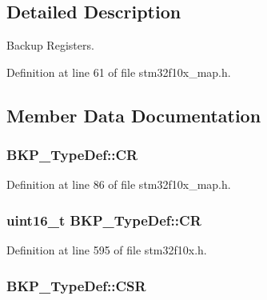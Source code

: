 \subsection{Detailed Description}
Backup Registers. 

Definition at line 61 of file stm32f10x\+\_\+map.\+h.



\subsection{Member Data Documentation}
\subsubsection[{\texorpdfstring{CR}{CR}}]{ B\+K\+P\+\_\+\+Type\+Def\+::\+CR}\hypertarget{struct_b_k_p___type_def_a26c650dee5082a29d3740a63e84ff94c}{}\label{struct_b_k_p___type_def_a26c650dee5082a29d3740a63e84ff94c}


Definition at line 86 of file stm32f10x\+\_\+map.\+h.

\subsubsection[{\texorpdfstring{CR}{CR}}]{ {\bf uint16\+\_\+t} B\+K\+P\+\_\+\+Type\+Def\+::\+CR}\hypertarget{struct_b_k_p___type_def_adbf9c928b534b4a017429de248982284}{}\label{struct_b_k_p___type_def_adbf9c928b534b4a017429de248982284}


Definition at line 595 of file stm32f10x.\+h.

\subsubsection[{\texorpdfstring{C\+SR}{CSR}}]{ B\+K\+P\+\_\+\+Type\+Def\+::\+C\+SR}\hypertarget{struct_b_k_p___type_def_ad32740838f70380f348cb897eb765b74}{}\label{struct_b_k_p___type_def_ad32740838f70380f348cb897eb765b74}


